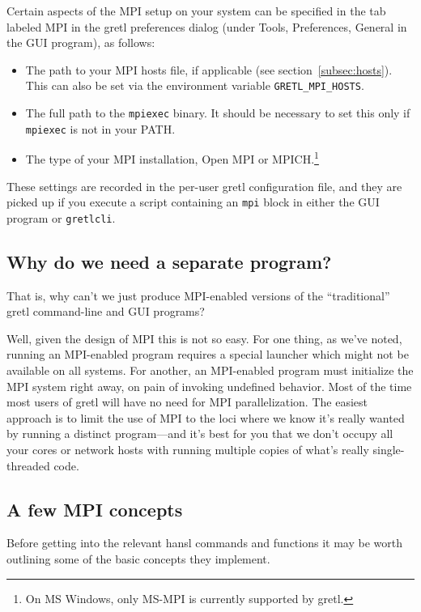 \documentclass{article}
\begin{document}
Certain aspects of the MPI setup on your system can be specified in
the tab labeled \textsf{MPI} in the gretl preferences dialog (under
\textsf{Tools}, \textsf{Preferences}, \textsf{General} in the GUI
program), as follows:
\begin{itemize}
\item The path to your MPI hosts file, if applicable (see
  section~\ref{subsec:hosts}). This can also be set via the
  environment variable \verb|GRETL_MPI_HOSTS|.
\item The full path to the \texttt{mpiexec} binary. It should be
  necessary to set this only if \texttt{mpiexec} is not in your PATH.
\item The type of your MPI installation, \textsf{Open MPI} or
  \textsf{MPICH}.\footnote{On MS Windows, only \textsf{MS-MPI} is
    currently supported by gretl.}
\end{itemize}

These settings are recorded in the per-user gretl configuration file,
and they are picked up if you execute a script containing an
\texttt{mpi} block in either the GUI program or \texttt{gretlcli}.

\subsection{Why do we need a separate program?}
\label{subsec:why-new-prog}

That is, why can't we just produce MPI-enabled versions of the
``traditional'' gretl command-line and GUI programs?

Well, given the design of MPI this is not so easy. For one thing, as
we've noted, running an MPI-enabled program requires a special
launcher which might not be available on all systems. For another, an
MPI-enabled program must initialize the MPI system right away, on pain
of invoking undefined behavior. Most of the time most users of gretl
will have no need for MPI parallelization. The easiest approach is to
limit the use of MPI to the loci where we know it's really wanted by
running a distinct program---and it's best for you that we don't
occupy all your cores or network hosts with running multiple copies of
what's really single-threaded code.

\subsection{A few MPI concepts}
\label{subsec:concepts}

Before getting into the relevant hansl commands and functions it may
be worth outlining some of the basic concepts they implement.
\end{document}
